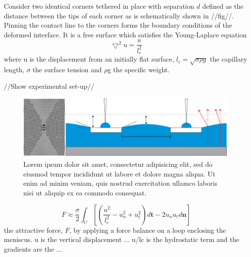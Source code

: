 \documentclass[twocolumn,prl]{revtex4-1}
\begin{document}
Consider two identical corners tethered in place with separation $d$ defined as the distance between the tips of each corner as is schematically shown in //fig//. Pinning the contact line to the corners forms the boundary conditions of the deformed interface. It is a free surface which satisfies the Young-Laplace equation
\begin{equation}
\bigtriangledown^2 u = \frac{u}{l_c^2}
\end{equation}
where u is the displacement from an initially flat surface, $l_c = \sqrt{\sigma\rho g}$ the capillary length, $\sigma$ the surface tension and $\rho$g the specific weight. 


























//Show experimental set-up//
\begin{figure}[htb!]

\includegraphics{Figures/Fig2.pdf}
\caption{Lorem ipsum dolor sit amet, consectetur adipisicing elit, sed do eiusmod tempor incididunt ut labore et dolore magna aliqua. Ut enim ad minim veniam, quis nostrud exercitation ullamco laboris nisi ut aliquip ex ea commodo consequat.}
\end{figure}


\begin{equation}\label{eqn:forcebalance}
F \approx \frac{\sigma}{2} \int _C [(\frac{u^2}{l_c^2}- u_n^2 +u_t^2 )d\textbf{t} - 2u_n u_t d\textbf{n}]
\end{equation}
	the attractive force, $F$, by applying a force balance on a loop enclosing the meniscus\cite{he2013capillary}. u is the vertical displacement ... u/lc is the hydrostatic term and the gradients are the ...
\end{document}
